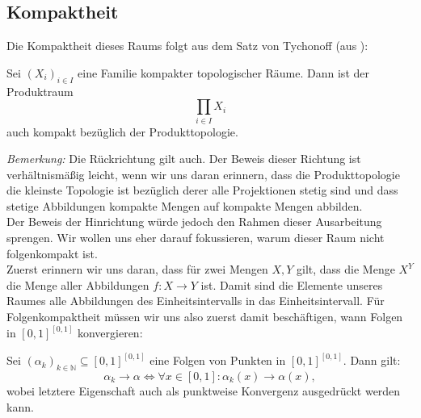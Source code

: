 \documentclass[11pt]{scrartcl}
\begin{document}
\subsection{Kompaktheit}
\noindent Die Kompaktheit dieses Raums folgt aus dem Satz von Tychonoff (aus \cite{Top}):
\begin{theorem}
	Sei $(X_i)_{i\in I}$ eine Familie kompakter topologischer Räume. Dann ist der Produktraum 
	$$\prod_{i\in I} X_i$$ auch kompakt bezüglich der Produkttopologie.
\end{theorem}
\textit{Bemerkung:} Die Rückrichtung gilt auch. Der Beweis dieser Richtung ist verhältnismäßig leicht, wenn
wir uns daran erinnern, dass die Produkttopologie die kleinste Topologie ist bezüglich derer alle Projektionen
stetig sind und dass stetige Abbildungen kompakte Mengen auf kompakte Mengen abbilden.\\
Der Beweis der Hinrichtung würde jedoch den Rahmen dieser Ausarbeitung sprengen. Wir wollen uns eher darauf fokussieren,
warum dieser Raum nicht folgenkompakt ist.\\
Zuerst erinnern wir uns daran, dass für zwei Mengen $X,Y$ gilt, dass die Menge $X^Y$ die Menge aller Abbildungen $f:X\rightarrow Y$
ist. Damit sind die Elemente unseres Raumes alle Abbildungen des Einheitsintervalls in das Einheitsintervall. Für Folgenkompaktheit
müssen wir uns also zuerst damit beschäftigen, wann Folgen in $[0,1]^{[0,1]}$ konvergieren:
\begin{theorem}
	Sei $(\alpha_k)_{k\in\mathbb N} \subseteq [0,1]^{[0,1]}$ eine Folgen von Punkten in $[0,1]^{[0,1]}$. Dann gilt:
	$$\alpha_k \rightarrow \alpha \iff \forall x\in[0,1]: \alpha_k(x)\rightarrow \alpha(x),$$
	wobei letztere Eigenschaft auch als punktweise Konvergenz ausgedrückt werden kann.
\end{theorem}
\end{document}
